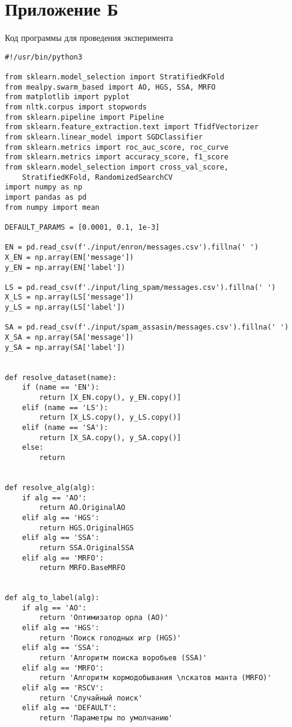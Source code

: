 \chapter*{Приложение Б}\label{App2}
\begin{center}Код программы для проведения эксперимента\end{center}
\begin{lstlisting}
#!/usr/bin/python3

from sklearn.model_selection import StratifiedKFold
from mealpy.swarm_based import AO, HGS, SSA, MRFO
from matplotlib import pyplot
from nltk.corpus import stopwords
from sklearn.pipeline import Pipeline
from sklearn.feature_extraction.text import TfidfVectorizer
from sklearn.linear_model import SGDClassifier
from sklearn.metrics import roc_auc_score, roc_curve
from sklearn.metrics import accuracy_score, f1_score
from sklearn.model_selection import cross_val_score, 
    StratifiedKFold, RandomizedSearchCV
import numpy as np
import pandas as pd
from numpy import mean

DEFAULT_PARAMS = [0.0001, 0.1, 1e-3]

EN = pd.read_csv(f'./input/enron/messages.csv').fillna(' ')
X_EN = np.array(EN['message'])
y_EN = np.array(EN['label'])

LS = pd.read_csv(f'./input/ling_spam/messages.csv').fillna(' ')
X_LS = np.array(LS['message'])
y_LS = np.array(LS['label'])

SA = pd.read_csv(f'./input/spam_assasin/messages.csv').fillna(' ')
X_SA = np.array(SA['message'])
y_SA = np.array(SA['label'])


def resolve_dataset(name):
    if (name == 'EN'):
        return [X_EN.copy(), y_EN.copy()]
    elif (name == 'LS'):
        return [X_LS.copy(), y_LS.copy()]
    elif (name == 'SA'):
        return [X_SA.copy(), y_SA.copy()]
    else:
        return


def resolve_alg(alg):
    if alg == 'AO':
        return AO.OriginalAO
    elif alg == 'HGS':
        return HGS.OriginalHGS
    elif alg == 'SSA':
        return SSA.OriginalSSA
    elif alg == 'MRFO':
        return MRFO.BaseMRFO


def alg_to_label(alg):
    if alg == 'AO':
        return 'Оптимизатор орла (AO)'
    elif alg == 'HGS':
        return 'Поиск голодных игр (HGS)'
    elif alg == 'SSA':
        return 'Алгоритм поиска воробьев (SSA)'
    elif alg == 'MRFO':
        return 'Алгоритм кормодобывания \nскатов манта (MRFO)'
    elif alg == 'RSCV':
        return 'Случайный поиск'
    elif alg == 'DEFAULT':
        return 'Параметры по умолчанию'



\end{lstlisting}
